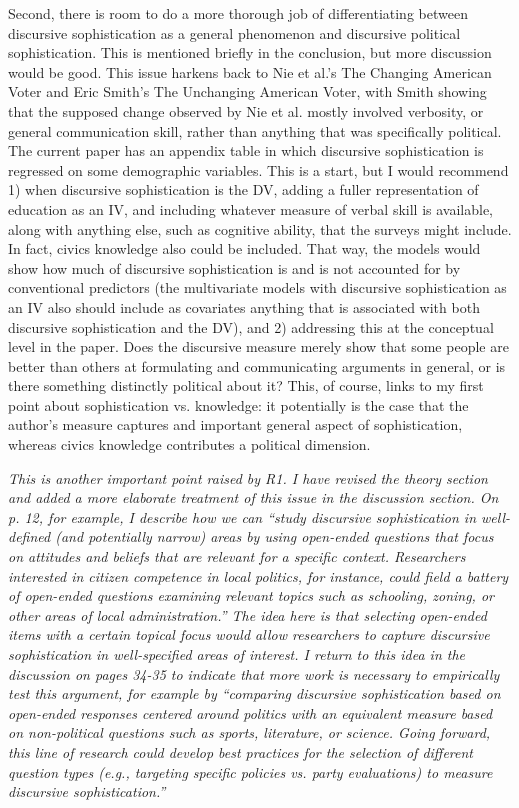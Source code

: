 Second, there is room to do a more thorough job of differentiating between discursive sophistication as a general phenomenon and discursive political sophistication. This is mentioned briefly in the conclusion, but more discussion would be good. This issue harkens back to Nie et al.'s The Changing American Voter and Eric Smith's The Unchanging American Voter, with Smith showing that the supposed change observed by Nie et al. mostly involved verbosity, or general communication skill, rather than anything that was specifically political. The current paper has an appendix table in which discursive sophistication is regressed on some demographic variables. This is a start, but I would recommend 1) when discursive sophistication is the DV, adding a fuller representation of education as an IV, and including whatever measure of verbal skill is available, along with anything else, such as cognitive ability, that the surveys might include. In fact, civics knowledge also could be included. That way, the models would show how much of discursive sophistication is and is not accounted for by conventional predictors (the multivariate models with discursive sophistication as an IV also should include as covariates anything that is associated with both discursive sophistication and the DV), and 2) addressing this at the conceptual level in the paper. Does the discursive measure merely show that some people are better than others at formulating and communicating arguments in general, or is there something distinctly political about it? This, of course, links to my first point about sophistication vs. knowledge: it potentially is the case that the author's measure captures and important general aspect of sophistication, whereas civics knowledge contributes a political dimension.

\textit{This is another important point raised by R1. I have revised the theory section and added a more elaborate treatment of this issue in the discussion section. On p. 12, for example, I describe how we can ``study discursive sophistication in well-defined (and potentially narrow) areas by using open-ended questions that focus on attitudes and beliefs that are relevant for a specific context. Researchers interested in citizen competence in local politics, for instance, could field a battery of open-ended questions examining relevant topics such as schooling, zoning, or other areas of local administration.'' The idea here is that selecting open-ended items with a certain topical focus would allow researchers to capture discursive sophistication in well-specified areas of interest. I return to this idea in the discussion on pages 34-35 to indicate that more work is necessary to empirically test this argument, for example by ``comparing discursive sophistication based on open-ended responses centered around politics with an equivalent measure based on non-political questions such as sports, literature, or science. Going forward, this line of research could develop best practices for the selection of different question types (e.g., targeting specific policies vs. party evaluations) to measure discursive sophistication.''}
	
